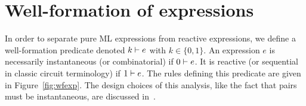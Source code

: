 \documentclass[9pt]{sigplanconf}
\begin{document}
\appendix

%


\begin{figure*}[t]


\caption{Well-formation rules}
\label{fig:wfexp}
\end{figure*}

\begin{figure*}[t]


\caption{Remaining rules for the big-step semantics}
\label{fig:big_step_other}
\end{figure*}

\vfill
\pagebreak

\section{Well-formation of expressions}
\label{sec:wfexp}

In order to separate pure ML expressions from reactive expressions, we define a well-formation predicate denoted $k \vdash e$ with $k \in \{0, 1\}$. An expression $e$ is necessarily instantaneous (or combinatorial) if $0 \vdash e$. It is reactive (or sequential in classic circuit terminology) if $1 \vdash e$. The rules defining this predicate are given in Figure~\ref{fig:wfexp}. The design choices of this analysis, like the fact that pairs must be instantaneous, are discussed in~\cite{Mandel:2005}.
\end{document}
